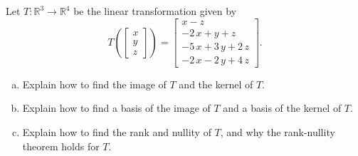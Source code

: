 
\begin{exerciseStatement}
 Let \(T:\mathbb{R}^ 3  \to \mathbb{R}^ 4 \) be the linear transformation given by \[T\left(  \left[\begin{array}{c}
x \\
y \\
z
\end{array}\right]  \right) =  \left[\begin{array}{c}
x - z \\
-2 \, x + y + z \\
-5 \, x + 3 \, y + 2 \, z \\
-2 \, x - 2 \, y + 4 \, z
\end{array}\right] .\]
\begin{enumerate}[(a)]
\item Explain how to find the image of \(T\) and the kernel of \(T\).
\item Explain how to find a basis of the image of \(T\) and a basis of the kernel of \(T\).
\item Explain how to find the rank and nullity of \(T\), and why the rank-nullity theorem holds for \(T\).
\end{enumerate}
    
\end{exerciseStatement}
    
